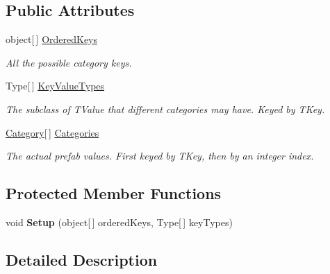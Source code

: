 \subsection*{Public Attributes}
\begin{DoxyCompactItemize}
\item 
object\mbox{[}$\,$\mbox{]} \hyperlink{class_skyrates_1_1_util_1_1_prefab_list_a84a3275441b5551101f11cb2f0e508fc}{Ordered\-Keys}
\begin{DoxyCompactList}\small\item\em All the possible category keys. \end{DoxyCompactList}\item 
Type\mbox{[}$\,$\mbox{]} \hyperlink{class_skyrates_1_1_util_1_1_prefab_list_adc9cd42231d5f2232f8e71cd0ab0dd56}{Key\-Value\-Types}
\begin{DoxyCompactList}\small\item\em The subclass of T\-Value that different categories may have. Keyed by T\-Key. \end{DoxyCompactList}\item 
\hyperlink{class_skyrates_1_1_util_1_1_prefab_list_1_1_category}{Category}\mbox{[}$\,$\mbox{]} \hyperlink{class_skyrates_1_1_util_1_1_prefab_list_abd1410aa765b2219337b60dab32083cb}{Categories}
\begin{DoxyCompactList}\small\item\em The actual prefab values. First keyed by T\-Key, then by an integer index. \end{DoxyCompactList}\end{DoxyCompactItemize}
\subsection*{Protected Member Functions}
\begin{DoxyCompactItemize}
\item 
\hypertarget{class_skyrates_1_1_util_1_1_prefab_list_a22a71103a86be9f4ae53323079e74936}{void {\bfseries Setup} (object\mbox{[}$\,$\mbox{]} ordered\-Keys, Type\mbox{[}$\,$\mbox{]} key\-Types)}\label{class_skyrates_1_1_util_1_1_prefab_list_a22a71103a86be9f4ae53323079e74936}

\end{DoxyCompactItemize}


\subsection{Detailed Description}




